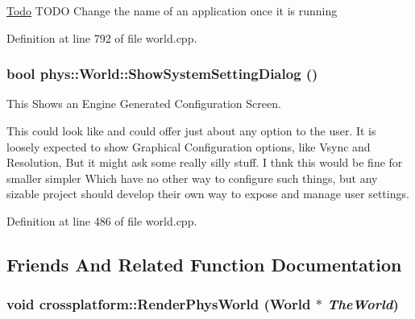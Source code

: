 \begin{Desc}
\item[\hyperlink{todo__todo000020}{Todo}]TODO Change the name of an application once it is running \end{Desc}




Definition at line 792 of file world.cpp.

\hypertarget{classphys_1_1World_a0d8ce136bebe81a6826b7e202a531f6a}{
\subsubsection[{ShowSystemSettingDialog}]{\setlength{\rightskip}{0pt plus 5cm}bool phys::World::ShowSystemSettingDialog ()}}
\label{da/ddf/classphys_1_1World_a0d8ce136bebe81a6826b7e202a531f6a}


This Shows an Engine Generated Configuration Screen. 

This could look like and could offer just about any option to the user. It is loosely expected to show Graphical Configuration options, like Vsync and Resolution, But it might ask some really silly stuff. I thnk this would be fine for smaller simpler Which have no other way to configure such things, but any sizable project should develop their own way to expose and manage user settings. 

Definition at line 486 of file world.cpp.



\subsection{Friends And Related Function Documentation}
\hypertarget{classphys_1_1World_ac7946bdb41c7884bcd7cfdec2b5358f0}{
\subsubsection[{crossplatform::RenderPhysWorld}]{\setlength{\rightskip}{0pt plus 5cm}void crossplatform::RenderPhysWorld ({\bf World} $\ast$ {\em TheWorld})}}
\label{da/ddf/classphys_1_1World_ac7946bdb41c7884bcd7cfdec2b5358f0}


